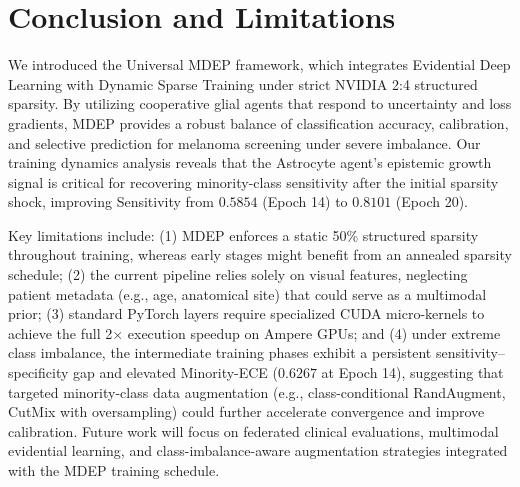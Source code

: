 \documentclass[letterpaper]{article} %
\begin{document}
\section{Conclusion and Limitations}\label{sec:conclusion}
We introduced the Universal MDEP framework, which integrates Evidential Deep Learning with Dynamic Sparse Training under strict NVIDIA 2:4 structured sparsity. By utilizing cooperative glial agents that respond to uncertainty and loss gradients, MDEP provides a robust balance of classification accuracy, calibration, and selective prediction for melanoma screening under severe imbalance. Our training dynamics analysis reveals that the Astrocyte agent's epistemic growth signal is critical for recovering minority-class sensitivity after the initial sparsity shock, improving Sensitivity from $0.5854$ (Epoch 14) to $0.8101$ (Epoch 20).

Key limitations include: (1) MDEP enforces a static 50\% structured sparsity throughout training, whereas early stages might benefit from an annealed sparsity schedule; (2) the current pipeline relies solely on visual features, neglecting patient metadata (e.g., age, anatomical site) that could serve as a multimodal prior; (3) standard PyTorch layers require specialized CUDA micro-kernels to achieve the full 2$\times$ execution speedup on Ampere GPUs; and (4) under extreme class imbalance, the intermediate training phases exhibit a persistent sensitivity--specificity gap and elevated Minority-ECE ($0.6267$ at Epoch 14), suggesting that targeted minority-class data augmentation (e.g., class-conditional RandAugment, CutMix with oversampling) could further accelerate convergence and improve calibration. Future work will focus on federated clinical evaluations, multimodal evidential learning, and class-imbalance-aware augmentation strategies integrated with the MDEP training schedule.
\end{document}
